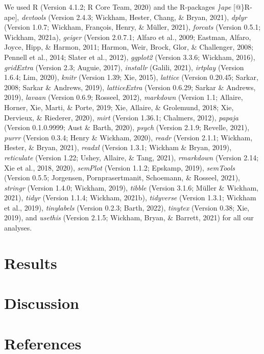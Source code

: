 \documentclass[
  english,
  man]{apa6}
\begin{document}
We used R (Version 4.1.2; R Core Team, 2020) and the R-packages \emph{\}ape} {[}@\}R-ape{]}, \emph{devtools} (Version 2.4.3; Wickham, Hester, Chang, \& Bryan, 2021), \emph{dplyr} (Version 1.0.7; Wickham, François, Henry, \& Müller, 2021), \emph{forcats} (Version 0.5.1; Wickham, 2021a), \emph{geiger} (Version 2.0.7.1; Alfaro et al., 2009; Eastman, Alfaro, Joyce, Hipp, \& Harmon, 2011; Harmon, Weir, Brock, Glor, \& Challenger, 2008; Pennell et al., 2014; Slater et al., 2012), \emph{ggplot2} (Version 3.3.6; Wickham, 2016), \emph{gridExtra} (Version 2.3; Auguie, 2017), \emph{installr} (Galili, 2021), \emph{irtplay} (Version 1.6.4; Lim, 2020), \emph{knitr} (Version 1.39; Xie, 2015), \emph{lattice} (Version 0.20.45; Sarkar, 2008; Sarkar \& Andrews, 2019), \emph{latticeExtra} (Version 0.6.29; Sarkar \& Andrews, 2019), \emph{lavaan} (Version 0.6.9; Rosseel, 2012), \emph{markdown} (Version 1.1; Allaire, Horner, Xie, Marti, \& Porte, 2019; Xie, Allaire, \& Grolemund, 2018; Xie, Dervieux, \& Riederer, 2020), \emph{mirt} (Version 1.36.1; Chalmers, 2012), \emph{papaja} (Version 0.1.0.9999; Aust \& Barth, 2020), \emph{psych} (Version 2.1.9; Revelle, 2021), \emph{purrr} (Version 0.3.4; Henry \& Wickham, 2020), \emph{readr} (Version 2.1.1; Wickham, Hester, \& Bryan, 2021), \emph{readxl} (Version 1.3.1; Wickham \& Bryan, 2019), \emph{reticulate} (Version 1.22; Ushey, Allaire, \& Tang, 2021), \emph{rmarkdown} (Version 2.14; Xie et al., 2018, 2020), \emph{semPlot} (Version 1.1.2; Epskamp, 2019), \emph{semTools} (Version 0.5.5; Jorgensen, Pornprasertmanit, Schoemann, \& Rosseel, 2021), \emph{stringr} (Version 1.4.0; Wickham, 2019), \emph{tibble} (Version 3.1.6; Müller \& Wickham, 2021), \emph{tidyr} (Version 1.1.4; Wickham, 2021b), \emph{tidyverse} (Version 1.3.1; Wickham et al., 2019), \emph{tinylabels} (Version 0.2.3; Barth, 2022), \emph{tinytex} (Version 0.38; Xie, 2019), and \emph{usethis} (Version 2.1.5; Wickham, Bryan, \& Barrett, 2021) for all our analyses.

\hypertarget{results}{%
\section{Results}\label{results}}

\hypertarget{discussion}{%
\section{Discussion}\label{discussion}}

\newpage

\hypertarget{references}{%
\section{References}\label{references}}
\end{document}
